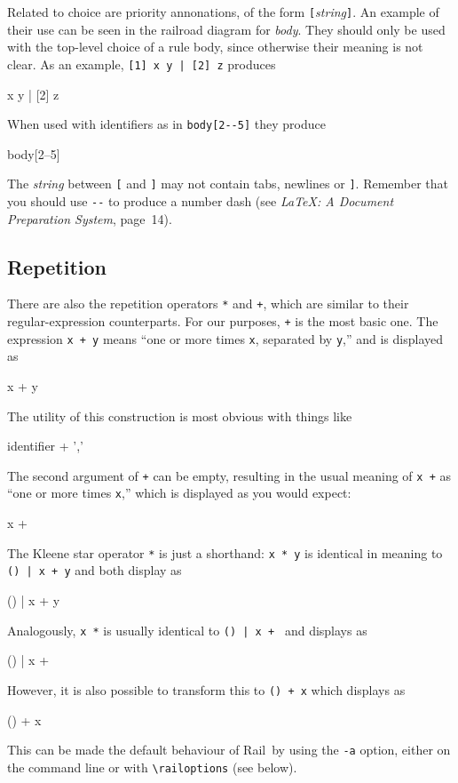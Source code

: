 \documentclass[a4paper]{article}
\newcommand\Rail{Rail}
\newcommand\nt[1]{\textit{#1}}
\newcommand\lit[1]{\texttt{#1}}
\begin{document}
Related to choice are priority annonations, of the form
\texttt{[}\nt{string}\texttt{]}. An example of their use can be seen in the
railroad diagram for \nt{body}. They should only be used with the
top-level choice of a rule body, since otherwise their meaning is
not clear. As an example, \verb![1] x y | [2] z! produces
\begin{rail}
[1] x y | [2] z
\end{rail}
When used with identifiers as in \verb!body[2--5]! they produce
\begin{rail}
body[2--5]
\end{rail}
The \nt{string} between \verb![! and \verb!]! may not contain tabs,
newlines or \verb!]!. Remember that you should use \verb!--!
to produce a number dash (see \emph{\LaTeX: A Document Preparation System},
page~14).

\subsection{Repetition}

There are also the repetition operators \verb!*! and \verb!+!, which are
similar to their regular-expression counterparts. For our purposes,
\verb!+! is the most basic one. The expression \verb!x + y! means ``one or
more times \verb!x!, separated by \verb!y!,'' and is displayed as
\begin{rail}
x + y
\end{rail}
The utility of this construction is most obvious with things like
\begin{rail}
identifier + ','
\end{rail}
The second argument of \verb!+! can be empty, resulting in the usual
meaning of \verb!x +! as ``one or more times \verb!x!,'' which is
displayed as you would expect:
\begin{rail}
x +
\end{rail}
The Kleene star operator \verb!*! is just a shorthand: \verb!x * y! is
identical in meaning to \verb!() | x + y! and both display as
\begin{rail}
() | x + y
\end{rail}
Analogously, \verb!x *! is usually identical to \verb!() | x + ! and
displays as
\begin{rail}
() | x +
\end{rail}
However, it is also possible to transform this to \verb!() + x! which
displays as
\begin{rail}
() + x
\end{rail}
This can be made the default behaviour of \Rail\ by using the \lit{-a}
option, either on the command line or with \verb!\railoptions! (see
below).
\end{document}
